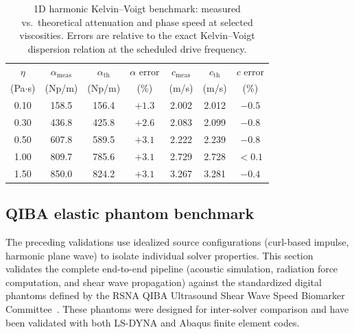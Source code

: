 \documentclass{iopjournal}
\begin{document}
\begin{table}
\caption{1D harmonic Kelvin--Voigt benchmark: measured vs.\ theoretical
  attenuation and phase speed at selected viscosities.  Errors are relative
  to the exact Kelvin--Voigt dispersion relation at the scheduled drive
  frequency.}
\centering
\begin{tabular}{c c c c c c c}
\hline
$\eta$ & $\alpha_{\mathrm{meas}}$ & $\alpha_{\mathrm{th}}$ & $\alpha$ error
       & $c_{\mathrm{meas}}$ & $c_{\mathrm{th}}$ & $c$ error \\
(Pa$\cdot$s) & (Np/m) & (Np/m) & (\%) & (m/s) & (m/s) & (\%) \\
\hline
0.10 & 158.5 & 156.4 & $+1.3$ & 2.002 & 2.012 & $-0.5$ \\
0.30 & 436.8 & 425.8 & $+2.6$ & 2.083 & 2.099 & $-0.8$ \\
0.50 & 607.8 & 589.5 & $+3.1$ & 2.222 & 2.239 & $-0.8$ \\
1.00 & 809.7 & 785.6 & $+3.1$ & 2.729 & 2.728 & $<0.1$ \\
1.50 & 850.0 & 824.2 & $+3.1$ & 3.267 & 3.281 & $-0.4$ \\
\hline
\end{tabular}
\label{tab:kv_results}
\end{table}


\subsection{QIBA elastic phantom benchmark}
\label{sec:qiba_validation}

The preceding validations use idealized source configurations (curl-based
impulse, harmonic plane wave) to isolate individual solver properties.  This
section validates the complete end-to-end pipeline (acoustic simulation,
radiation force computation, and shear wave propagation) against the
standardized digital phantoms defined by the RSNA QIBA Ultrasound Shear Wave
Speed Biomarker Committee~\cite{palmeri2017fem}.  These phantoms were
designed for inter-solver comparison and have been validated with both LS-DYNA
and Abaqus finite element codes.
\end{document}
